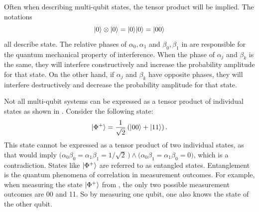 Often when describing multi-qubit states, the tensor product will be implied.
The notations
\begin{equation}
\vert{0}\rangle \otimes \vert{0}\rangle = \vert{0}\rangle\vert{0}\rangle = \vert{00}\rangle
\end{equation}
all describe state.
The relative phases of $\alpha_0, \alpha_1$ and $\beta_0, \beta_1$ in  are responsible for the quantum mechanical property of interference.
When the phase of $\alpha_j$ and $\beta_k$ is the same, they will interfere constructively and increase the probability amplitude for that state.
On the other hand, if $\alpha_j$ and $\beta_k$ have opposite phases, they will interfere destructively and decrease the probability amplitude for that state.

Not all multi-qubit systems can be expressed as a tensor product of individual states as shown in .
Consider the following state:
\begin{equation} \label{eqn:bell-state}
\vert{\Phi^+}\rangle = \dfrac{1}{\sqrt{2}}\left(\vert{00}\rangle + \vert{11}\rangle\right).
\end{equation}
This state cannot be expressed as a tensor product of two individual states, as that would imply $\big(\alpha_0\beta_0 = \alpha_1\beta_1 = 1/\sqrt2\,\big) \wedge \big(\alpha_0\beta_1 = \alpha_1\beta_0 = 0\big)$, which is a contradiction.
States like $\vert{\Phi^+}\rangle$ are referred to as entangled states.
Entanglement is the quantum phenomena of correlation in measurement outcomes.
For example, when measuring the state $\vert{\Phi^+}\rangle$ from , the only two possible measurement outcomes are 00 and 11.
So by measuring one qubit, one also knows the state of the other qubit.


